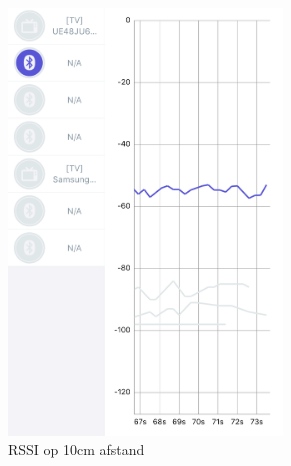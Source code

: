 \begin{figure}[H]
    \begin{subfigure}{0.5\textwidth}
        \centering
    
        \includegraphics[width=0.8\textwidth]{img/rssi_10cm_small.png} 
        \caption{RSSI op 10cm afstand}
        \label{fig:rssi_meting_10cm}
    \end{subfigure}
    \begin{subfigure}{0.5\textwidth}
        \centering
    

\end{subfigure}
\end{figure}
